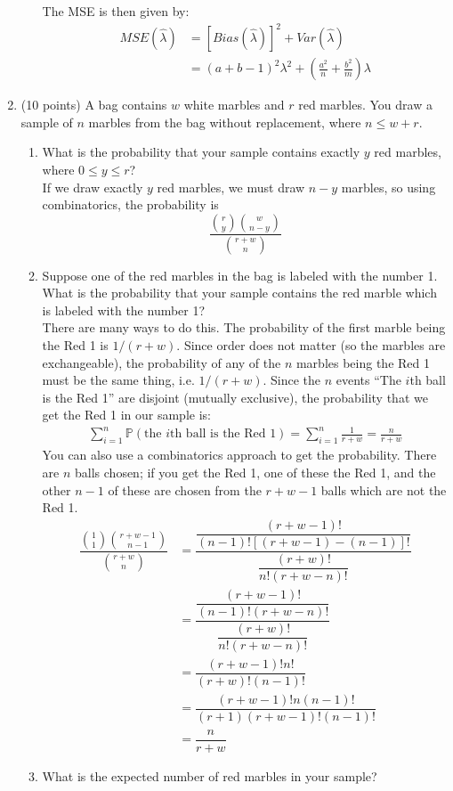 \documentclass[12pt]{article}
\def\P{{\mathbb P}}
\begin{document}
\begin{enumerate}
\begin{enumerate}
The MSE is then given by:
\begin{align*}
MSE(\hat{\lambda}) &= [Bias(\hat{\lambda})]^2 + Var( \hat{\lambda} ) \\
&= (a + b - 1)^2 \lambda^2 + \left( \frac{a^2}{n} + \frac{b^2}{m} \right) \lambda
\end{align*}
\end{enumerate}

\pagebreak

\item (10 points) A bag contains $w$ white marbles and $r$ red marbles. You draw a sample of $n$ marbles from the bag without replacement, where $n \leq w + r$.
\begin{enumerate}
\item What is the probability that your sample contains exactly $y$ red marbles, where $0 \leq y \leq r$?\\

If we draw exactly $y$ red marbles, we must draw $n - y$ marbles, so using combinatorics, the probability is
\[
\dfrac{ \binom{r}{y} \binom{w}{n-y } }{ \binom{r + w}{n} }
\]
\item Suppose one of the red marbles in the bag is labeled with the number 1. What is the probability that your sample contains the red marble which is labeled with the number 1?\\

There are many ways to do this. The probability of the first marble being the Red 1 is $1 / (r + w)$. Since order does not matter (so the marbles are exchangeable), the probability of any of the $n$ marbles being the Red 1 must be the same thing, i.e. $1 / (r + w)$. Since the $n$ events ``The $i$th ball is the Red 1'' are disjoint (mutually exclusive), the probability that we get the Red 1 in our sample is:
\begin{align*}
\sum_{i=1}^n \P(\text{the $i$th ball is the Red 1}) = \sum_{i=1}^n \frac{1}{r + w} = \frac{n}{r+w}
\end{align*}
You can also use a combinatorics approach to get the probability. There are $n$ balls chosen; if you get the Red 1, one of these the Red 1, and the other $n-1$ of these are chosen from the $r+w-1$ balls which are not the Red 1.
\begin{align*}
\dfrac{ \binom{1}{1} \binom{r+w-1}{n-1} }{ \binom{r + w}{n} } &= \dfrac{ \dfrac{ (r+w-1)! }{ (n-1)![ (r+w-1) - (n-1 )]! } } { \dfrac{ (r+w)!}{ n! (r+w-n)! }} \\
&= \dfrac{ \dfrac{ (r+w-1)! }{ (n-1)! (r+w-n)! } } { \dfrac{ (r+w)!}{ n! (r+w-n)! }} \\
&= \dfrac{ (r+w-1)! n!} { (r+w)! (n-1)! } \\
&= \dfrac{ (r+w-1)! n(n-1)!} { (r+1)(r+w-1)! (n-1)! } \\
&= \dfrac{ n }{ r+w }
\end{align*}
\item What is the expected number of red marbles in your sample?\\


\end{enumerate}
\end{enumerate}
\end{document}
